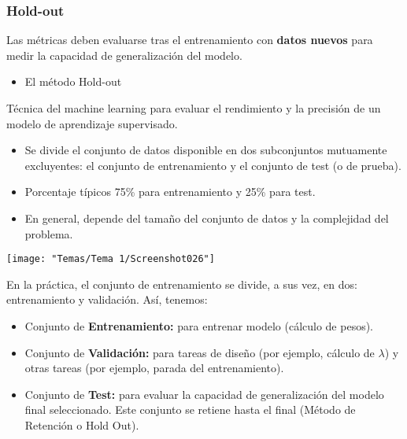 \subsubsection{Hold-out}
Las métricas deben evaluarse tras el entrenamiento con \textbf{datos nuevos} para medir la capacidad de generalización del modelo. 
\begin{itemize}[label=\color{red}\textbullet, leftmargin=*]
	\item \color{lightblue}El método Hold-out
\end{itemize}
Técnica del machine learning para evaluar el rendimiento y la precisión de un modelo de aprendizaje supervisado.
\begin{itemize}
	\item Se divide el conjunto de datos disponible en dos subconjuntos mutuamente excluyentes: el conjunto de entrenamiento y el conjunto de test (o de prueba).
	\item Porcentaje típicos 75\% para entrenamiento y 25\% para test.
	\item En general, depende del tamaño del conjunto de datos y la complejidad del problema.
\end{itemize}
\begin{center}
	\texttt{[image: "Temas/Tema 1/Screenshot026"]}
\end{center}
En la práctica, el conjunto de entrenamiento se divide, a sus vez, en dos: entrenamiento y validación. Así, tenemos:
\begin{itemize}
	\item Conjunto de \textbf{Entrenamiento:} para entrenar modelo (cálculo de pesos).
	\item Conjunto de \textbf{Validación:} para tareas de diseño (por ejemplo, cálculo de $\lambda$) y otras tareas (por ejemplo, parada del entrenamiento).
	\item Conjunto de \textbf{Test:} para evaluar la capacidad de generalización del modelo final seleccionado. Este conjunto se retiene hasta el final (Método de Retención o Hold Out).
\end{itemize}

